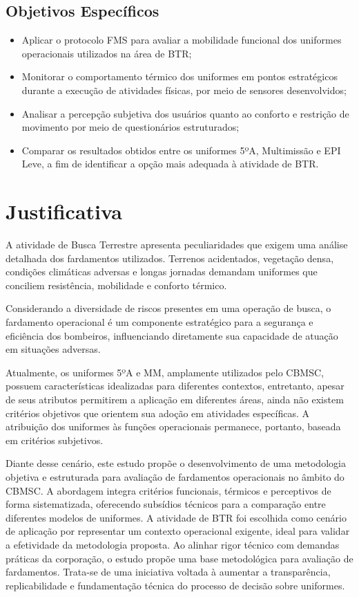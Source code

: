		\subsection{Objetivos Específicos}
			\begin{itemize}
				\item Aplicar o protocolo \acrfull{FMS} para avaliar a mobilidade funcional dos uniformes operacionais utilizados na área de \acrlong{BTR};
				\item Monitorar o comportamento térmico dos uniformes em pontos estratégicos durante a execução de atividades físicas, por meio de sensores desenvolvidos;
				\item Analisar a percepção subjetiva dos usuários quanto ao conforto e restrição de movimento por meio de questionários estruturados;
				\item Comparar os resultados obtidos entre os uniformes 5ºA, Multimissão e \acrshort{EPI} Leve, a fim de identificar a opção mais adequada à atividade de \acrlong{BTR}.
			\end{itemize}

\section{Justificativa}
	
	A atividade de Busca Terrestre apresenta peculiaridades que exigem uma análise detalhada dos 
	fardamentos utilizados. Terrenos acidentados, vegetação densa, condições climáticas adversas 
	e longas jornadas demandam uniformes que conciliem resistência, mobilidade e conforto térmico.
	
	Considerando a diversidade de riscos presentes em uma operação de busca, o fardamento operacional é um componente estratégico para
	 a segurança e eficiência dos bombeiros, influenciando diretamente sua capacidade de atuação em situações adversas.
	
	Atualmente, os uniformes 5ºA e \acrlong{MM}, amplamente utilizados pelo \acrshort{CBMSC}, possuem 
	características idealizadas para diferentes contextos,
	  entretanto, apesar de seus atributos permitirem a aplicação em diferentes áreas, ainda não existem critérios objetivos que 
	  orientem sua adoção em atividades específicas. A atribuição dos uniformes às funções operacionais 
	  permanece, portanto, baseada em critérios subjetivos.
	
	  Diante desse cenário, este estudo propõe o desenvolvimento de uma metodologia objetiva e estruturada
	   para avaliação de fardamentos operacionais no âmbito do \acrshort{CBMSC}. A abordagem integra 
	   critérios funcionais, térmicos e perceptivos de forma sistematizada, oferecendo subsídios técnicos para 
	   a comparação entre diferentes modelos de uniformes. A atividade de \acrlong{BTR} foi escolhida 
	   como cenário de aplicação por representar um contexto operacional exigente, ideal para validar a 
	   efetividade da metodologia proposta. Ao alinhar rigor técnico com demandas práticas da corporação, 
	   o estudo propõe uma base metodológica para avaliação de fardamentos. Trata-se de uma iniciativa 
	   voltada à aumentar a transparência, replicabilidade e fundamentação técnica do processo de decisão
	   sobre uniformes.
